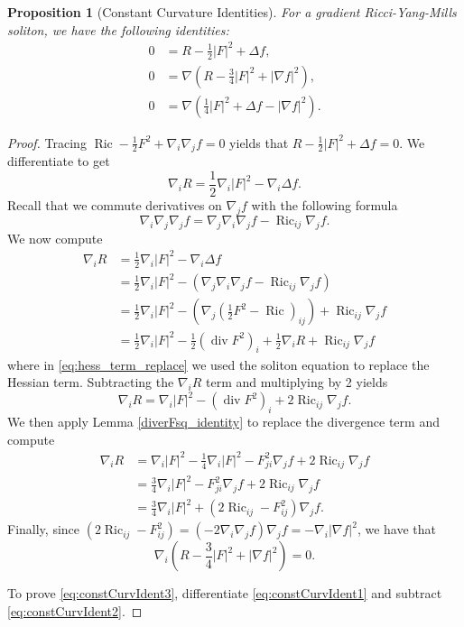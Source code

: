 \documentclass[12pt, a4paper, reqno, oneside]{amsart}
\DeclareMathOperator{\diver}{div}
\DeclareMathOperator{\Ric}{Ric}
\numberwithin{equation}{section}
\theoremstyle{plain}
\newtheorem{proposition}[theorem]{Proposition}
\theoremstyle{definition}
\theoremstyle{plain}
\begin{document}
\begin{proposition}[Constant Curvature Identities]\label{constCurvIdent}
  For a gradient Ricci-Yang-Mills soliton, we have the following identities:
  \begin{align}
    0 &= R-\frac{1}{2}|F|^{2}+\Delta f, \label{eq:constCurvIdent1}\\
    0 &= \nabla\left(R-\frac{3}{4}|F|^{2}+|\nabla f|^{2}\right), \label{eq:constCurvIdent2}\\
    0 &= \nabla\left(\frac{1}{4}|F|^{2}+\Delta f-|\nabla f|^{2}\right). \label{eq:constCurvIdent3}
  \end{align}
\end{proposition}
\begin{proof}
  Tracing $\Ric -\frac{1}{2}F^{2}+\nabla_{i}\nabla_{j}f=0$ yields that $R-\frac{1}{2}|F|^{2}+\Delta f=0$. We differentiate to get
  \[
    \nabla_{i} R = \frac{1}{2}\nabla_{i}|F|^{2}-\nabla_{i}\Delta f.
  \]
  Recall that we commute derivatives on $\nabla_{j}f$ with the following formula
  \[
    \nabla_{i}\nabla_{j}\nabla_{j} f = \nabla_{j}\nabla_{i}\nabla_{j} f- \Ric_{ij}\nabla_{j}f.
  \]
  We now compute
  \begin{align}
    \nabla_{i} R &= \frac{1}{2}\nabla_{i}|F|^{2}-\nabla_{i}\Delta f \nonumber\\
      &= \frac{1}{2}\nabla_{i}|F|^{2}-\left(\nabla_{j}\nabla_{i}\nabla_{j}f-\Ric_{ij}\nabla_{j}f\right) \nonumber\\
      &= \frac{1}{2}\nabla_{i}|F|^{2}-\left(\nabla_{j}\left(\frac{1}{2}F^{2}-\Ric\right)_{ij}\right)+\Ric_{ij}\nabla_{j}f \label{eq:hess_term_replace}\\
      &= \frac{1}{2}\nabla_{i}|F|^{2}-\frac{1}{2}\left(\diver F^{2}\right)_{i}+\frac{1}{2}\nabla_{i} R+\Ric_{ij}\nabla_{j} f \nonumber 
  \end{align}
  where in \eqref{eq:hess_term_replace} we used the soliton equation to replace the Hessian term. Subtracting the $\nabla_{i}R$ term and multiplying by 2 yields
  \[
    \nabla_{i}R = \nabla_{i}|F|^{2}-(\diver F^{2})_{i}+2\Ric_{ij}\nabla_{j} f.
  \]
  We then apply Lemma \ref{diverFsq_identity} to replace the divergence term and compute
  \begin{align*}
    \nabla_{i}R &= \nabla_{i}|F|^{2}-\frac{1}{4}\nabla_{i}|F|^{2}-F_{ji}^{2}\nabla_{j}f+2\Ric_{ij}\nabla_{j}f\\
      &= \frac{3}{4}\nabla_{i}|F|^{2}-F_{ji}^{2}\nabla_{j} f+2\Ric_{ij}\nabla_{j}f\\
      &= \frac{3}{4}\nabla_{i}|F|^{2}+\left(2\Ric_{ij}-F_{ij}^{2}\right)\nabla_{j}f.
  \end{align*}
  Finally, since $(2\Ric_{ij}-F_{ij}^{2})=(-2\nabla_{i}\nabla_{j}f)\nabla_{j}f=-\nabla_{i}|\nabla f|^{2}$, we have that
  \[
    \nabla_{i}\left(R-\frac{3}{4}|F|^{2}+|\nabla f|^{2}\right) = 0.
  \]

  To prove \eqref{eq:constCurvIdent3}, differentiate \eqref{eq:constCurvIdent1} and subtract \eqref{eq:constCurvIdent2}.
\end{proof}
\end{document}
